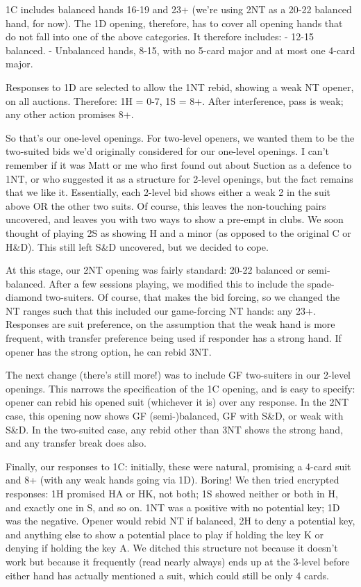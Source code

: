 1C includes balanced hands 16-19 and 23+ (we're using 2NT as a 20-22 balanced
hand, for now).  The 1D opening, therefore, has to cover all opening hands that
do not fall into one of the above categories.  It therefore includes:
    - 12-15 balanced.
    - Unbalanced hands, 8-15, with no 5-card major and at most one 4-card
      major.

Responses to 1D are selected to allow the 1NT rebid, showing a weak NT opener,
on all auctions.  Therefore: 1H = 0-7, 1S = 8+.  After interference, pass is
weak; any other action promises 8+.

So that's our one-level openings.  For two-level openers, we wanted them to be
the two-suited bids we'd originally considered for our one-level openings.  I
can't remember if it was Matt or me who first found out about Suction as a
defence to 1NT, or who suggested it as a structure for 2-level openings, but
the fact remains that we like it.  Essentially, each 2-level bid shows either a
weak 2 in the suit above OR the other two suits.  Of course, this leaves the
non-touching pairs uncovered, and leaves you with two ways to show a pre-empt
in clubs.  We soon thought of playing 2S as showing H and a minor (as opposed
to the original C or H&D).  This still left S&D uncovered, but we decided to
cope.

At this stage, our 2NT opening was fairly standard: 20-22 balanced or
semi-balanced.  After a few sessions playing, we modified this to include the
spade-diamond two-suiters.  Of course, that makes the bid forcing, so we
changed the NT ranges such that this included our game-forcing NT hands: any
23+.  Responses are suit preference, on the assumption that the weak hand is
more frequent, with transfer preference being used if responder has a strong
hand.  If opener has the strong option, he can rebid 3NT.

The next change (there's still more!) was to include GF two-suiters in our
2-level openings.  This narrows the specification of the 1C opening, and is
easy to specify: opener can rebid his opened suit (whichever it is) over any
response.  In the 2NT case, this opening now shows GF (semi-)balanced, GF with
S&D, or weak with S&D.  In the two-suited case, any rebid other than 3NT shows
the strong hand, and any transfer break does also.

Finally, our responses to 1C: initially, these were natural, promising a 4-card
suit and 8+ (with any weak hands going via 1D).  Boring!  We then tried
encrypted responses: 1H promised HA or HK, not both; 1S showed neither or both
in H, and exactly one in S, and so on.  1NT was a positive with no potential
key; 1D was the negative.  Opener would rebid NT if balanced, 2H to deny a
potential key, and anything else to show a potential place to play if holding
the key K or denying if holding the key A.  We ditched this structure not
because it doesn't work but because it frequently (read nearly always) ends up
at the 3-level before either hand has actually mentioned a suit, which could
still be only 4 cards.

